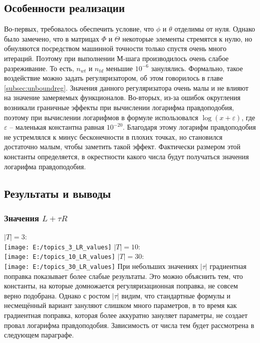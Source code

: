 \documentclass[12pt]{article}
\begin{document}
\subsection{Особенности реализации}
Во-первых, требовалось обеспечить условие, что $\phi$ и $\theta$ отделимы от нуля. Однако было замечено, что в матрицах $\Phi$ и $\Theta$ некоторые элементы стремятся к нулю, но обнуляются посредством машинной точности только спустя очень много итераций. Поэтому при выполнении М-шага производилось очень слабое разреживание. То есть, $n_{wt}$ и $n_{td}$ меньшие $10^{-6}$ занулялись. Формально, такое воздействие можно задать регуляризатором, об этом говорилось в главе \ref{subsec:unboundreg}. Значения данного регуляризатора очень малы и не влияют на значение замеряемых функционалов.
Во-вторых, из-за ошибок округления возникали граничные эффекты при вычислении логарифма правдоподобия, поэтому при вычислении логарифмов в формуле использовался $\log(x + \varepsilon)$, где $\varepsilon$ --  маленькая константна равная $10^{-20}$. Благодаря этому логарифм правдоподобия не устремлялся к минус бесконечности в плохих точках, но становился достаточно малым, чтобы заметить такой эффект. Фактически размером этой константы определяется, в окрестности какого числа будут получаться  значения логарифма правдоподобия.
\subsection{Результаты и выводы}
\subsubsection{Значения $L + \tau R$}
$|T| = 3$:\\
\texttt{[image: E:/topics\_3\_LR\_values]}
$|T| = 10$:\\
\texttt{[image: E:/topics\_10\_LR\_values]}
$|T| = 30$:\\
\texttt{[image: E:/topics\_30\_LR\_values]}
При небольших значениях $|\tau|$ градиентная поправка показывает более слабые результаты. Это можно объяснить тем, что константы, на которые домножается регуляризационная поправка,  не совсем верно подобрана. Однако с ростом $|\tau|$ видим, что стандартные формулы и несмещённый вариант зануляют слишком много параметров, в то время как градиентная поправка, которая более аккуратно зануляет параметры, не создает провал логарифма правдоподобия. Зависимость от числа тем будет рассмотрена в следующем параграфе.
\end{document}

